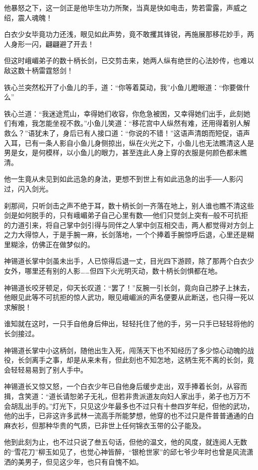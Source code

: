 \documentclass[12pt,oneside]{book}
\begin{document}
他暴怒之下，这一剑正是他毕生功力所聚，当真是快如电击，势若雷露，声威之绍，震人魂魄！

白衣少女毕竟功力还浅，眼见如此声势，竟不敢攫其锋锐，再施展那移花妙手，两人身形一闪，翩翩避了开去！

但这时峨嵋弟子的数十柄长剑，已交剪击来，她两人纵有绝世的心法妙传，也难以敌这数十柄雷霆怒剑！

铁心兰突然松开了小鱼儿的手，道：``你等着莫动，我''小鱼儿瞪眼道：``你要做什么''

铁心兰道：``我迷途荒山，幸得她们收容，你危急被困，又幸得她们出手，此刻她们有难，我怎能坐视不救。''小鱼儿笑道：``移花宫中人纵然有难，还用得着别人解救么？''语犹未了，身后已有人接口道：``你说的不错！''这语声清朗而短促，语声入耳，已有一条人影自小鱼儿身侧掠出，纵在火光之下，小鱼儿也无法瞧清这人是男是女，是何模样，以小鱼儿的眼力，甚至连此人身上穿的衣服是何颜色都未瞧清。

他一生竟从未见到如此迅急的身法，更想不到世上有如此迅急的出手──人影闪过，闪入剑光。

刹那间，只听剑击之声不绝于耳，数十柄长剑一齐落在地上，别人谁也瞧不清这些剑是如何脱手的，只有峨嵋弟子自己心里有数──他们只觉剑上突有─般不可抗拒的力道引来，将自己掌中剑引得与同伴之人掌中剑互相交击，两人都觉得对方剑上之力大得惊人，于是手腕一麻，长剑落地，一个个捧着手腕惊呼后退，心里还是糊里糊涂，仿佛正在做梦似的。

神锡道长掌中剑虽未出手，人已惊得后退一丈，目光四下游顾，除了那两个白衣少女外，哪里还有别的人影\ldots\ldots 但四下火光明灭动，数十柄长剑惧都在地。

神锡道长咬牙顿足，仰天长叹道：``罢了！''反腕一引长剑，竟向自己脖子上抹去，他眼见此等不可抗拒的惊人武功，眼见峨嵋派的声名便要从此断送，也只得一死以求解脱！

谁知就在这时，一只手自他身后伸出，轻轻托住了他的手，另一只手已轻轻将他的长剑接过。

神锡道长掌中小这柄剑，随他出生入死，闯荡天下也不知经历了多少惊心动魄的战役，长剑离手之事，却是从来未有，但此刻也不知怎地，这柄生死不离的长剑，竟会轻轻易易到了别人手中。

神锡道长又惊又怒，一个白衣少年已自他身后缓步走出，双手捧着长剑，从容而揖，含笑道：``道长请恕弟子无礼，但若非贵派道友向妇人家出手，弟子也万万不会胡乱出手的。''灯光下，只见这少年最多也不过只有十叁四岁年纪，但他的武功，他的出手，已非这许多武林一流高手所能梦想，他穿的也不过只是件普普通通的白麻衣衫，但那种华贵的气质，已非世上任何锦衣玉带的公子能及。

他到此刻为止，也不过只说了叁五句话，但他的温文，他的风度，就连阅人无数的``雪花刀''柳玉如见了，也觉心神皆醉，``银枪世家''的邱七爷少年时也曾是风流潇洒的美男子，但见这少年，也只有自愧不如。
\end{document}
